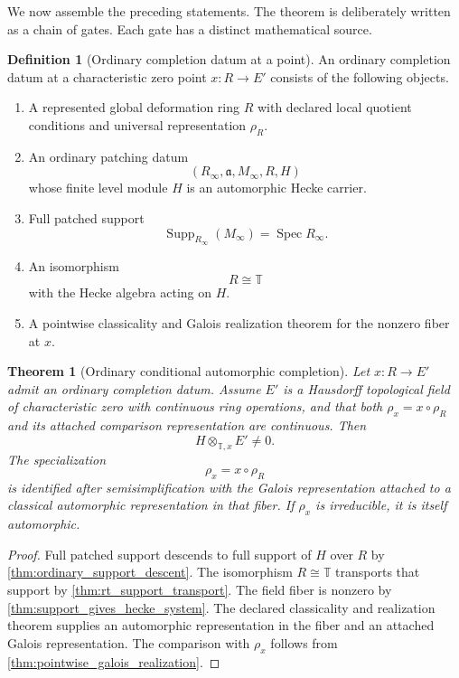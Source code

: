 \documentclass[11pt]{amsart}
\newtheorem{theorem}{Theorem}[section]
\theoremstyle{definition}
\newtheorem{definition}[definition]{Definition}
\theoremstyle{remark}
\newcommand{\TT}{\mathbb T}
\newcommand{\Spec}{\operatorname{Spec}}
\newcommand{\Supp}{\operatorname{Supp}}
\newcommand{\fraka}{\mathfrak a}
\begin{document}
We now assemble the preceding statements. The theorem is deliberately written as a chain of gates. Each gate has a distinct mathematical source.

\begin{definition}[Ordinary completion datum at a point]\label{def:ordinary_completion_datum}
An ordinary completion datum at a characteristic zero point \(x:R\to E'\) consists of the following objects.
\begin{enumerate}
\item A represented global deformation ring \(R\) with declared local quotient conditions and universal representation \(\rho_R\).
\item An ordinary patching datum
\[
(R_\infty,\fraka,M_\infty,R,H)
\]
whose finite level module \(H\) is an automorphic Hecke carrier.
\item Full patched support
\[
\Supp_{R_\infty}(M_\infty)=\Spec R_\infty.
\]
\item An isomorphism
\[
R\cong\TT
\]
with the Hecke algebra acting on \(H\).
\item A pointwise classicality and Galois realization theorem for the nonzero fiber at \(x\).
\end{enumerate}
\end{definition}

\begin{theorem}[Ordinary conditional automorphic completion]\label{thm:ordinary_conditional_completion}
Let \(x:R\to E'\) admit an ordinary completion datum. Assume \(E'\) is a Hausdorff topological field of characteristic zero with continuous ring operations, and that both \(\rho_x=x\circ\rho_R\) and its attached comparison representation are continuous. Then
\[
\boxed{
H\otimes_{\TT,x}E'\neq0.
}
\]
The specialization
\[
\rho_x=x\circ\rho_R
\]
is identified after semisimplification with the Galois representation attached to a classical automorphic representation in that fiber. If \(\rho_x\) is irreducible, it is itself automorphic.
\end{theorem}

\begin{proof}
Full patched support descends to full support of \(H\) over \(R\) by
\cref{thm:ordinary_support_descent}. The isomorphism \(R\cong\TT\) transports that support by \cref{thm:rt_support_transport}. The field fiber is nonzero by
\cref{thm:support_gives_hecke_system}. The declared classicality and realization theorem supplies an automorphic representation in the fiber and an attached Galois representation. The comparison with \(\rho_x\) follows from \cref{thm:pointwise_galois_realization}.
\end{proof}
\end{document}
